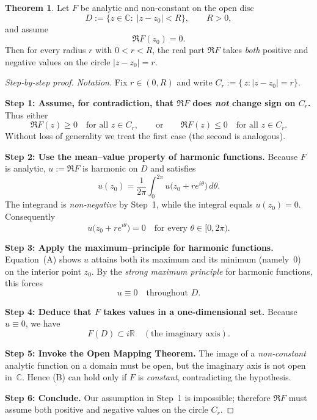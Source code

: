 \documentclass[12pt]{article}
\theoremstyle{definition} %
\newtheorem{theorem}{Theorem}
\theoremstyle{plain} %
\begin{document}
  \begin{theorem}
    \label{thm:sign‐change}
    Let $F$ be analytic and non‑constant on the open disc 
    \[
    D:=\{z\in\mathbb C:\;|z-z_{0}|<R\},
    \qquad R>0,
    \]
    and assume 
    \[
    \Re F(z_{0}) = 0 .
    \]
    Then for every radius $r$ with $0<r<R$, the real part $\Re F$
    takes \emph{both} positive and negative values on the circle 
    $|z-z_{0}| = r$.
    \end{theorem}
    
    \begin{proof}[Step‑by‑step proof]
    \emph{Notation.}  
    Fix $r\in(0,R)$ and write $C_{r}:=\{\,z:|z-z_{0}|=r\}$.
    
    \medskip
    \textbf{Step 1: Assume, for contradiction, that $\Re F$ does \emph{not} change sign on $C_{r}$.}  
    Thus either
    \[
    \Re F(z)\ge 0\quad\text{for all }z\in C_{r},
    \qquad\text{or}\qquad
    \Re F(z)\le 0\quad\text{for all }z\in C_{r}.
    \]
    Without loss of generality we treat the first case (the second is analogous).
    
    \medskip
    \textbf{Step 2: Use the mean–value property of harmonic functions.}  
    Because $F$ is analytic, $u:=\Re F$ is harmonic on $D$ and satisfies  
    \[
    u(z_{0})=\frac{1}{2\pi}\int_{0}^{2\pi}
              u\!\bigl(z_{0}+re^{i\theta}\bigr)\,d\theta .
    \]
    The integrand is \emph{non‑negative} by Step~1, while the integral equals
    $u(z_{0})=0$.  
    Consequently
    \[
    u\!\bigl(z_{0}+re^{i\theta}\bigr)=0
    \quad\text{for every }\theta\in[0,2\pi).
    \tag{A}
    \]
    
    \medskip
    \textbf{Step 3: Apply the maximum–principle for harmonic functions.}  
    Equation~(A) shows $u$ attains both its maximum and its minimum (namely~$0$)
    on the interior point $z_{0}$.  
    By the \emph{strong maximum principle} for harmonic functions,
    this forces
    \[
    u\equiv 0 \quad\text{throughout } D .
    \tag{B}
    \]
    
    \medskip
    \textbf{Step 4: Deduce that $F$ takes values in a one‑dimensional set.}  
    Because $u\equiv 0$, we have
    \[
    F(D)\subset i\mathbb{R}\quad(\text{the imaginary axis}).
    \]
    
    \medskip
    \textbf{Step 5: Invoke the Open Mapping Theorem.}  
    The image of a \emph{non‑constant} analytic function on a domain must be open,
    but the imaginary axis is not open in~$\mathbb C$.  
    Hence (B) can hold only if $F$ is \emph{constant}, contradicting the
    hypothesis.
    
    \medskip
    \textbf{Step 6: Conclude.}  
    Our assumption in Step~1 is impossible; therefore $\Re F$ must assume
    both positive and negative values on the circle $C_{r}$.
    \end{proof}
\end{document}
